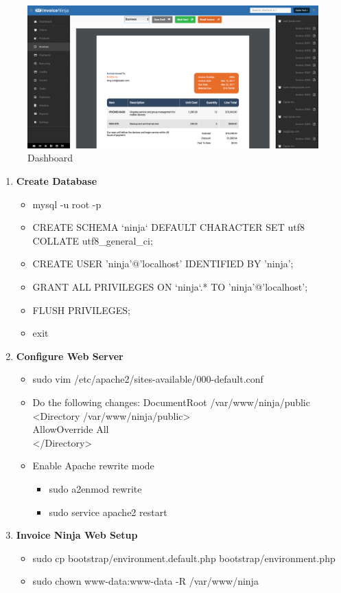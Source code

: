 \begin{figure}[!ht]
\centering
\includegraphics[width=1\textwidth]{images/5.png}                   
\caption{Dashboard}
\hspace{-1.5em}
\end{figure}
\begin{enumerate}
\item \textbf{Create Database}
\begin{itemize}
\item mysql -u root -p
\item CREATE SCHEMA `ninja` DEFAULT CHARACTER SET utf8 COLLATE utf8\_general\_ci;
\item CREATE USER 'ninja'@'localhost' IDENTIFIED BY 'ninja';
\item GRANT ALL PRIVILEGES ON `ninja`.* TO 'ninja'@'localhost';
\item FLUSH PRIVILEGES;
\item exit
\end{itemize}
\item \textbf{Configure Web Server}
\begin{itemize}
\item sudo vim /etc/apache2/sites-available/000-default.conf
\item Do the following changes:
    DocumentRoot /var/www/ninja/public\\
    <Directory /var/www/ninja/public>\\
    AllowOverride All\\
    </Directory>
\item Enable Apache rewrite mode
\begin{itemize}
 \item sudo a2enmod rewrite
\item sudo service apache2 restart
\end{itemize}
\end{itemize}
\item \textbf{Invoice Ninja Web Setup}
\begin{itemize}
\item sudo cp bootstrap/environment.default.php bootstrap/environment.php
\item sudo chown www-data:www-data -R /var/www/ninja
\end{itemize}


\end{enumerate}

